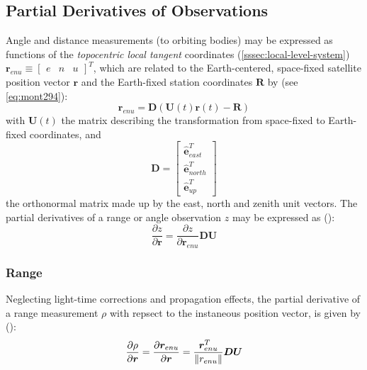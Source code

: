 \subsection{Partial Derivatives of Observations}
Angle and distance measurements (to orbiting bodies) may be expressed as 
functions of the \emph{topocentric local tangent} coordinates 
(\ref{sssec:local-level-system}) 
$\bm{r}_{enu} \equiv \begin{bmatrix}e & n & u \end{bmatrix}^T$, 
which are related to the Earth-centered, space-fixed satellite position vector 
$\bm{r}$ and the Earth-fixed station coordinates $\bm{R}$ by (see 
\ref{eq:mont294}):
\begin{equation}
  \label{eq:mont791}
  \bm{r}_{enu} = \bm{D} \left( \bm{U}(t) \bm{r}(t) - \bm{R} \right)
\end{equation}
with $\bm{U}(t)$ the matrix describing the transformation from space-fixed to 
Earth-fixed coordinates, and
\begin{equation}
  \label{eq:mont792}
  \bm{D} = \begin{bmatrix}
    \hat{\bm{e}}^T_{east} \\
    \hat{\bm{e}}^T_{north} \\
    \hat{\bm{e}}^T_{up}
    \end{bmatrix}
\end{equation}
the orthonormal matrix made up by the east, north and zenith unit vectors. The 
partial derivatives of a range or angle observation $z$ may be expressed as 
(\cite{Montenbruck2000}):
\begin{equation}
  \label{eq:mont793}
  \frac{\partial z}{\partial \bm{r}} 
   = \frac{\partial z}{\partial \bm{r}_{enu}} \bm{D} \bm{U}
\end{equation}

\subsubsection{Range}
\label{sssec:range}
Neglecting light-time corrections and propagation effects, the partial derivative 
of a range measurement $\rho$ with repsect to the instaneous position vector, 
is given by (\cite{Montenbruck2000}):
\begin{equation}
  \label{eq:mont794}
  \frac{\partial \rho}{\partial \bm{r}} = 
  \frac{\partial \bm{r} _{enu}}{\partial \bm{r}} =
  \frac{\bm{r}^T_{enu}}{\lVert r_{enu}\rVert} \bm{D} \bm{U}
\end{equation}

